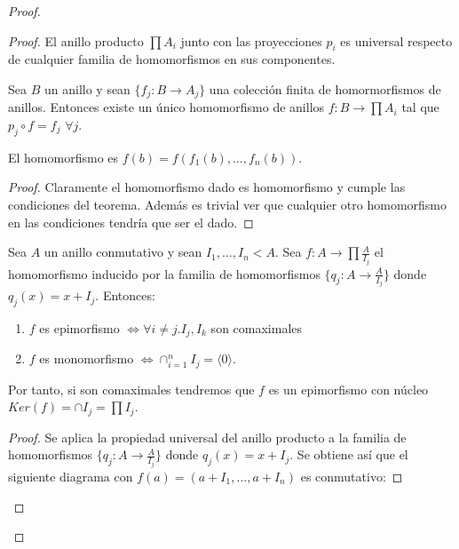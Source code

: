 \begin{proof}
\begin{proof}
El anillo producto $\prod A_i$ junto con las proyecciones $p_i$ es universal respecto de cualquier familia de homomorfismos en sus componentes. 

\begin{proposition}
Sea $B$ un anillo y sean $\{f_j:B \to A_j\}$ una colección finita de homormorfismos de anillos. Entonces existe un único homomorfismo de anillos $f:B \to \prod A_i$ tal que $p_j \circ f = f_j$ $\forall j$. 

El homomorfismo es $f(b) = f(f_1(b),\ldots,f_n(b))$.
\end{proposition}
\begin{proof}
Claramente el homomorfismo dado es homomorfismo y cumple las condiciones del teorema. Además es trivial ver que cualquier otro homomorfismo en las condiciones tendría que ser el dado. 
\end{proof}

\begin{theorem}
Sea $A$ un anillo conmutativo y sean $I_1,\ldots,I_n < A$. Sea $f:A \to \prod \frac{A}{I_j}$ el homomorfismo inducido por la familia de homomorfismos $\{q_j:A \to \frac{A}{I_j}\}$ donde $q_j(x) = x+I_j$. Entonces:

\begin{enumerate}
\item $f$ es epimorfismo $\iff \forall i \neq j. I_j,I_k$ son comaximales
\item $f$ es monomorfismo $\iff \cap_{i = 1}^n I_j = \langle 0 \rangle$. 
\end{enumerate}

Por tanto, si son comaximales tendremos que $f$ es un epimorfismo con núcleo $Ker(f) = \cap I_j = \prod I_j$. 
\end{theorem}
\begin{proof}
Se aplica la propiedad universal del anillo producto a la familia de homomorfismos $\{q_j:A \to \frac{A}{I_j}\}$ donde $q_j(x) = x+I_j$. Se obtiene así que el siguiente diagrama con $f(a) = (a+I_1,\ldots,a+I_n)$ es conmutativo:



\end{proof}
\end{proof}
\end{proof}
